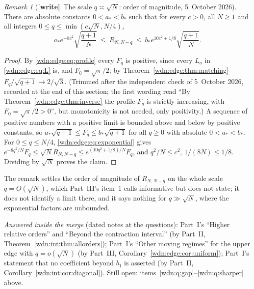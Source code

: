 \documentclass[11pt,letterpaper]{article}
\theoremstyle{remark}\newtheorem{remark}[theorem]{Remark}
\newcommand{\wtag}{\textup{\textbf{[write]}}}
\begin{document}
\begin{remark}[\wtag\ The scale $q\asymp\sqrt N$: order of magnitude, 5~October 2026]\label{wdn:rem:sqrtscale}
There are absolute constants $0<a_*<b_*$ such that for every $c>0$, all $N\ge1$ and all integers $0\le q\le\min(c\sqrt N,N/4)$,
\[
 a_*e^{-8c^2}\sqrt{\frac{q+1}N}\ \le\ R_{N,N-q}\ \le\ b_*e^{10c^2+1/8}\sqrt{\frac{q+1}N}.
\]
\end{remark}
\begin{proof}
By \eqref{wdn:edge:eq:profile} every $F_q$ is positive, since every $L_a$ in \eqref{wdn:edge:eq:L} is, and $F_0=\sqrt\pi/2$; by Theorem~\ref{wdn:edge:thm:matching} $F_q/\sqrt{q+1}\to2/\sqrt3$. \textup{(Trimmed after the independent check of 5~October 2026, recorded at the end of this section; the first wording read ``By Theorem~\ref{wdn:edge:thm:inverse} the profile $F_q$ is strictly increasing, with $F_0=\sqrt\pi/2>0$'', but monotonicity is not needed, only positivity.)} A sequence of positive numbers with a positive limit is bounded above and below by positive constants, so $a_*\sqrt{q+1}\le F_q\le b_*\sqrt{q+1}$ for all $q\ge0$ with absolute $0<a_*<b_*$. For $0\le q\le N/4$, \eqref{wdn:edge:eq:exponential} gives $e^{-8q^2/N}F_q\le\sqrt NR_{N,N-q}\le e^{(10q^2+1/8)/N}F_q$, and $q^2/N\le c^2$, $1/(8N)\le1/8$. Dividing by $\sqrt N$ proves the claim.
\end{proof}
The remark settles the order of magnitude of $R_{N,N-q}$ on the whole scale $q=O(\sqrt N)$, which Part~III's item~1 calls informative but does not state; it does not identify a limit there, and it says nothing for $q\gg\sqrt N$, where the exponential factors are unbounded.

\emph{Answered inside the merge} (dated notes at the questions): Part~I's ``Higher relative orders'' and ``Beyond the contraction interval'' (by Part~II, Theorem~\ref{wdn:int:thm:allorders}); Part~I's ``Other moving regimes'' for the upper edge with $q=o(\sqrt N)$ (by Part~III, Corollary~\ref{wdn:edge:cor:uniform}); Part~I's statement that no coefficient beyond $b_1$ is asserted (by Part~II, Corollary~\ref{wdn:int:cor:diagonal}). Still open: items~\ref{wdn:q:gap}--\ref{wdn:q:sharper} above.
\end{document}
